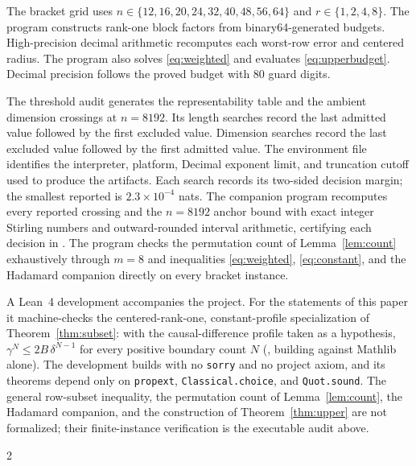 \documentclass[10pt]{article}
\theoremstyle{definition}
\begin{document}
The bracket grid uses
\(n\in\{12,16,20,24,32,40,48,56,64\}\) and
\(r\in\{1,2,4,8\}\).  The program constructs rank-one block factors from
binary64-generated budgets.  High-precision decimal arithmetic recomputes each
worst-row error and centered radius.  The program also solves
\eqref{eq:weighted} and evaluates \eqref{eq:upperbudget}.  Decimal precision follows the proved budget
with 80 guard digits.

The threshold audit generates the representability table and the ambient
dimension crossings at \(n=8192\).  Its length searches record the last
admitted value followed by the first excluded value.  Dimension searches
record the last excluded value followed by the first admitted value.  The
environment file identifies the interpreter, platform, Decimal exponent
limit, and truncation cutoff used to produce the artifacts.  Each search
records its two-sided decision margin; the smallest reported is
\(2.3\times10^{-4}\) nats.  The companion program
 recomputes every reported
crossing and the \(n=8192\) anchor bound with exact integer Stirling numbers
and outward-rounded interval arithmetic, certifying each decision in
.  The program
 checks the permutation
count of Lemma~\ref{lem:count} exhaustively through \(m=8\) and inequalities
\eqref{eq:weighted}, \eqref{eq:constant}, and the Hadamard companion
directly on every bracket instance.

A Lean~4 development accompanies the project.  For the statements of this
paper it machine-checks the centered-rank-one, constant-profile
specialization of Theorem~\ref{thm:subset}: with the causal-difference
profile taken as a hypothesis, \(\gamma^N\le2B\,\delta^{N-1}\) for every
positive boundary count \(N\) (, building against
Mathlib alone).  The development builds with no \texttt{sorry} and no
project axiom, and its theorems depend only on \texttt{propext},
\texttt{Classical.choice}, and \texttt{Quot.sound}.  The general row-subset
inequality, the permutation count of Lemma~\ref{lem:count}, the Hadamard
companion, and the construction of Theorem~\ref{thm:upper} are not
formalized; their finite-instance verification is the executable audit
above.

\begin{multicols}{2}
\footnotesize
{}
\setlength{\bibsep}{1pt}


\end{multicols}
\end{document}
